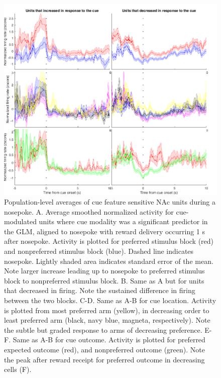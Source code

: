 \documentclass[11pt]{article}
\begin{document}
\begin{figure}[h]
\centering
\includegraphics[width=\textwidth]{Fig 10 - NP population averages.png}
\caption{Population-level averages of cue feature sensitive NAc units during a nosepoke. A. Average smoothed normalized activity for cue-modulated units where cue modality was a significant predictor in the GLM, aligned to nosepoke with reward delivery occurring 1 s after nosepoke. Activity is plotted for preferred stimulus block (red) and nonpreferred stimulus block (blue). Dashed line indicates nosepoke. Lightly shaded area indicates standard error of the mean. Note larger increase leading up to nosepoke to preferred stimulus block to nonpreferred stimulus block. B. Same as A but for units that decreased in firing. Note the sustained difference in firing between the two blocks. C-D. Same as A-B for cue location. Activity is plotted from most preferred arm (yellow), in decreasing order to least preferred arm (black, navy blue, magneta, respectively). Note the subtle but graded response to arms of decreasing preference. E-F. Same as A-B for cue outcome. Activity is plotted for preferred expected outcome (red), and nonpreferred outcome (green). Note the peak after reward receipt for preferred outcome in decreasing cells (F).}
\label{fig:NP_pop}
\end{figure}
\end{document}
